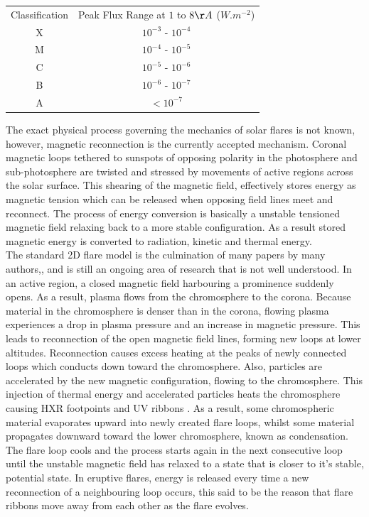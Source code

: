 \begin{tabular}{|c|c|}\label{GOES}
Classification & Peak Flux Range at $1$ to $8\AA$ ($W.m^{-2}$)\\ 
X & $10^{-3}$ - $10^{-4}$\\ 
M & $10^{-4}$ - $10^{-5}$\\ 
C & $10^{-5}$ - $10^{-6}$\\ 
B & $10^{-6}$ - $10^{-7}$\\ 
A & $<10^{-7}$\\  
\end{tabular}


The exact physical process governing the mechanics of solar flares is not known, however, magnetic reconnection is the currently accepted mechanism. Coronal magnetic loops tethered to sunspots of opposing polarity in the photosphere and sub-photosphere are twisted and stressed by movements of active regions across the solar surface. This shearing of the magnetic field, effectively stores energy as magnetic tension which can be released when opposing field lines meet and reconnect. The process of energy conversion is basically a unstable tensioned magnetic field relaxing back to a more stable configuration. As a result stored magnetic energy is converted to radiation, kinetic and thermal energy\citep{1976SoPh...50...85K}.\\
The standard 2D flare model is the culmination of many papers by many authors,\citep{1964NASSP..50..451C, 1966Natur.211..695S, 1974SoPh...34..323H, 1976SoPh...50...85K}, and is still an ongoing area of research that is not well understood. In an active region, a closed magnetic field harbouring a prominence suddenly opens. As a result, plasma flows from the chromosphere to the corona. Because material in the chromosphere is denser than in the corona, flowing plasma experiences a drop in plasma pressure and an increase in magnetic pressure. This leads to reconnection of the open magnetic field lines, forming new loops at lower altitudes. Reconnection causes excess heating at the peaks of newly connected loops which conducts down toward the chromosphere. Also, particles are accelerated by the new magnetic configuration, flowing to the chromosphere. This injection of thermal energy and accelerated particles heats the chromosphere causing HXR footpoints \citep{1995ApJ...455..347A} and UV ribbons \citep{2009A&A...493..241F}. As a result, some chromospheric material evaporates upward into newly created flare loops, whilst some material propagates downward toward the lower chromosphere, known as condensation. The flare loop cools and the process starts again in the next consecutive loop until the unstable magnetic field has relaxed to a state that is closer to it's stable,  potential state. In eruptive flares, energy is released every time a new reconnection of a neighbouring loop occurs, this said to be the reason that flare ribbons move away from each other as the flare evolves. 

